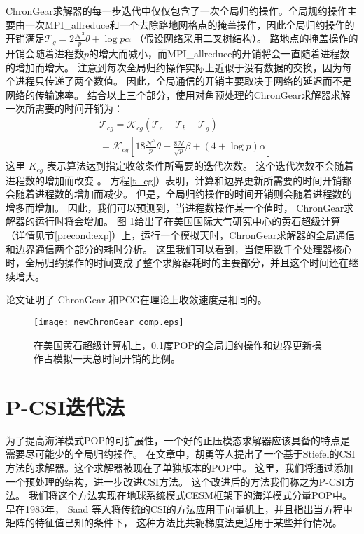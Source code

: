  
ChronGear求解器的每一步迭代中仅仅包含了一次全局归约操作。全局规约操作主要由一次MPI\_allreduce和一个去除路地网格点的掩盖操作，因此全局归约操作的开销满足$\mathcal{T}_g= 2\frac{\mathcal{N}^2}{p}\theta + \log p \alpha$ （假设网络采用二叉树结构）。 
路地点的掩盖操作的开销会随着进程数$p$的增大而减小，而MPI\_allreduce的开销将会一直随着进程数的增加而增大。 
注意到每次全局归约操作实际上近似于没有数据的交换，因为每个进程只传递了两个数值。
因此，全局通信的开销主要取决于网络的延迟而不是网络的传输速率。
结合以上三个部分，使用对角预处理的ChronGear求解器求解一次所需要的时间开销为：
\begin{eqnarray}
\label{t_cg}
&\mathcal{T}_{cg}=\mathcal{K}_{cg} (\mathcal{T}_c + \mathcal{T}_b+\mathcal{T}_g )\nonumber \\
&=\mathcal{K}_{cg} [18 \frac{\mathcal{N}^2}{p}\theta + \frac{8\mathcal{N}}{\sqrt{p}}\beta +(4+\log p)\alpha]
\end{eqnarray}
这里 $K_{cg}$ 表示算法达到指定收敛条件所需要的迭代次数。
这个迭代次数不会随着进程数的增加而改变 \cite{hu2013scalable}。 
方程\ref{t_cg}）表明，计算和边界更新所需要的时间开销都会随着进程数的增加而减少。 
但是，全局归约操作的时间开销则会随着进程数的增多而增加。 
因此，我们可以预测到，当进程数操作某一个值时， ChronGear求解器的运行时将会增加。 
图 \ref{fig:ChronGearCOMP}给出了在美国国际大气研究中心的黄石超级计算（详情见节\ref{precond:exp}）上，运行一个模拟天时，ChronGear求解器的全局通信和边界通信两个部分的耗时分析。 
这里我们可以看到，当使用数千个处理器核心时，全局归约操作的时间变成了整个求解器耗时的主要部分，并且这个时间还在继续增大。 
 
论文证明了 ChronGear  和PCG在理论上收敛速度是相同的。 

\begin{figure}[!t]
\begin{center}
	\texttt{[image: newChronGear\_comp.eps]}
\caption[] {在美国黄石超级计算机上，0.1度POP的全局归约操作和边界更新操作占模拟一天总时间开销的比例。}
\label{fig:ChronGearCOMP}
\end{center}
\end{figure}
 


\section{P-CSI迭代法}
\label{precond:pcsi}

为了提高海洋模式POP的可扩展性，一个好的正压模态求解器应该具备的特点是需要尽可能少的全局归约操作。 
在文章\cite{hu2013scalable}中，胡勇等人提出了一个基于Stiefel的CSI方法的求解器。这个求解器被现在了单独版本的POP中。 
这里，我们将通过添加一个预处理的结构，进一步改进CSI方法。
这个改进后的方法我们称之为P-CSI方法。 我们将这个方法实现在地球系统模式CESM框架下的海洋模式分量POP中。 
早在1985年， Saad 等人\cite{saad1985solving}将传统的CSI的方法应用于向量机上，并且指出当方程中矩阵的特征值已知的条件下， 这种方法比共轭梯度法更适用于某些并行情况。 


